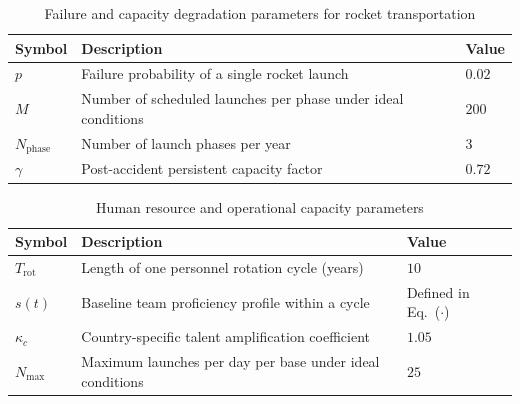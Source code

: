 \documentclass[12pt]{article}
\begin{document}
\begin{table}[htbp]
\centering
\renewcommand{\arraystretch}{1.2}
\begin{tabular}{lll}
\hline
Symbol & Description & Value \\
\hline
$p$                    & Failure probability of a single rocket launch                 & $0.02$ \\
$M$                    & Number of scheduled launches per phase under ideal conditions  & $200$ \\
$N_{\mathrm{phase}}$   & Number of launch phases per year                               & $3$ \\
$\gamma$               & Post-accident persistent capacity factor                       & $0.72$ \\
\hline
\end{tabular}
\caption{Failure and capacity degradation parameters for rocket transportation}
\label{tab:failure_parameters}
\end{table}

\begin{table}[htbp]
\centering
\renewcommand{\arraystretch}{1.2}
\begin{tabular}{lll}
\hline
Symbol & Description & Value \\
\hline
$T_{\mathrm{rot}}$   & Length of one personnel rotation cycle (years)            & $10$ \\
$s(t)$               & Baseline team proficiency profile within a cycle          & Defined in Eq.~($\cdot$) \\
$\kappa_c$           & Country-specific talent amplification coefficient         & $1.05$ \\
$N_{\max}$           & Maximum launches per day per base under ideal conditions  & $25$ \\
\hline
\end{tabular}
\caption{Human resource and operational capacity parameters}
\label{tab:human_parameters}
\end{table}
\end{document}
